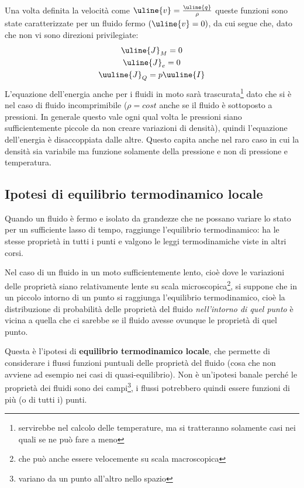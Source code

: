 Una volta definita la velocità come $\uline{v} = \frac{\uline{q}}{\rho}$ queste funzioni sono state caratterizzate per un fluido fermo $(\uline{v} = 0)$, da cui segue che, dato che non vi sono direzioni privilegiate:
%
	\begin{equation*}
		\begin{gathered}
			\uline{J}_M = 0 \\
			\uline{J}_e = 0 \\
			\uuline{J}_Q = p \uuline{I} 
		\end{gathered}
	\end{equation*}
%
L'equazione dell'energia anche per i fluidi in moto sarà trascurata\footnote{servirebbe nel calcolo delle temperature, ma si tratteranno solamente casi nei quali se ne può fare a meno} dato che si è nel caso di fluido incomprimibile ($\rho = cost$ anche se il fluido è sottoposto a pressioni. In generale questo vale ogni qual volta le pressioni siano sufficientemente piccole da non creare variazioni di densità), quindi l'equazione dell'energia è disaccoppiata dalle altre. 
Questo capita anche nel raro caso in cui la densità sia variabile ma funzione solamente della pressione e non di pressione e temperatura.

\subsection{Ipotesi di equilibrio termodinamico locale}
Quando un fluido è fermo e isolato da grandezze che ne possano variare lo stato per un sufficiente lasso di tempo, raggiunge l'equilibrio termodinamico: ha le stesse proprietà in tutti i punti e valgono le leggi termodinamiche viste in altri corsi.

Nel caso di un fluido in un moto sufficientemente lento, cioè dove le variazioni delle proprietà siano relativamente lente su scala microscopica\footnote{che può anche essere velocemente su scala macroscopica}, si suppone che in un piccolo intorno di un punto si raggiunga l'equilibrio termodinamico, cioè la distribuzione di probabilità delle proprietà del fluido \textit{nell'intorno di quel punto} è vicina a quella che ci sarebbe se il fluido avesse ovunque le proprietà di quel punto. 

Questa è l'ipotesi di \textbf{equilibrio termodinamico locale}, che permette di considerare i flussi funzioni puntuali delle proprietà del fluido (cosa che non avviene ad esempio nei casi di quasi-equilibrio).
Non è un'ipotesi banale perché le proprietà dei fluidi sono dei campi\footnote{variano da un punto all'altro nello spazio}, i flussi potrebbero quindi essere funzioni di più (o di tutti i) punti.

